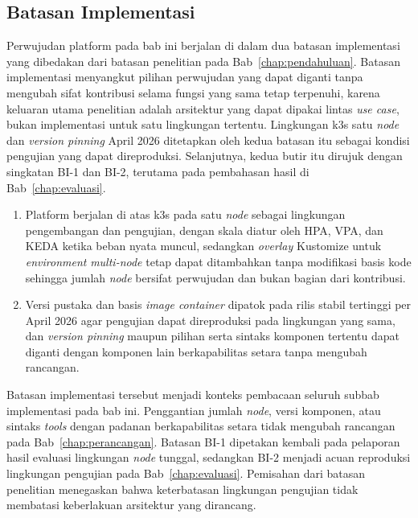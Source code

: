 

\subsection{Batasan Implementasi}
\label{subsec:batasan-implementasi}

Perwujudan platform pada bab ini berjalan di dalam dua batasan implementasi yang dibedakan dari batasan penelitian pada Bab~\ref{chap:pendahuluan}. Batasan implementasi menyangkut pilihan perwujudan yang dapat diganti tanpa mengubah sifat kontribusi selama fungsi yang sama tetap terpenuhi, karena keluaran utama penelitian adalah arsitektur yang dapat dipakai lintas \textit{use case}, bukan implementasi untuk satu lingkungan tertentu. Lingkungan k3s satu \textit{node} dan \textit{version pinning} April 2026 ditetapkan oleh kedua batasan itu sebagai kondisi pengujian yang dapat direproduksi. Selanjutnya, kedua butir itu dirujuk dengan singkatan BI-1 dan BI-2, terutama pada pembahasan hasil di Bab~\ref{chap:evaluasi}.

\vspace{0.5em}
\begin{enumerate}
    \item Platform berjalan di atas k3s pada satu \textit{node} sebagai lingkungan pengembangan dan pengujian, dengan skala diatur oleh HPA, VPA, dan KEDA ketika beban nyata muncul, sedangkan \textit{overlay} Kustomize untuk \textit{environment} \textit{multi-node} tetap dapat ditambahkan tanpa modifikasi basis kode sehingga jumlah \textit{node} bersifat perwujudan dan bukan bagian dari kontribusi.

    \item Versi pustaka dan basis \textit{image container} dipatok pada rilis stabil tertinggi per April 2026 agar pengujian dapat direproduksi pada lingkungan yang sama, dan \textit{version pinning} maupun pilihan serta sintaks komponen tertentu dapat diganti dengan komponen lain berkapabilitas setara tanpa mengubah rancangan.
\end{enumerate}

Batasan implementasi tersebut menjadi konteks pembacaan seluruh subbab implementasi pada bab ini. Penggantian jumlah \textit{node}, versi komponen, atau sintaks \textit{tools} dengan padanan berkapabilitas setara tidak mengubah rancangan pada Bab~\ref{chap:perancangan}. Batasan BI-1 dipetakan kembali pada pelaporan hasil evaluasi lingkungan \textit{node} tunggal, sedangkan BI-2 menjadi acuan reproduksi lingkungan pengujian pada Bab~\ref{chap:evaluasi}. Pemisahan dari batasan penelitian menegaskan bahwa keterbatasan lingkungan pengujian tidak membatasi keberlakuan arsitektur yang dirancang.

